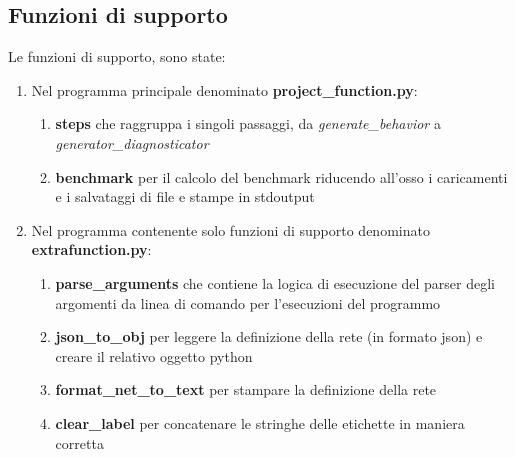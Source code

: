 \subsection{Funzioni di supporto}
Le funzioni di supporto, sono state:
\begin{enumerate}
    \item Nel programma principale denominato \textbf{project\_function.py}:
    \begin{enumerate}
        \item \textbf{steps} che raggruppa i singoli passaggi, da \textit{generate\_behavior }a \textit{generator\_diagnosticator}
        \item \textbf{benchmark} per il calcolo del benchmark riducendo all'osso i caricamenti e i salvataggi di file e stampe in stdoutput
    \end{enumerate}
    \item Nel programma contenente solo funzioni di supporto denominato \textbf{extrafunction.py}:
    \begin{enumerate}
        \item \textbf{parse\_arguments} che contiene la logica di esecuzione del parser degli argomenti da linea di comando per l'esecuzioni del programmo
        \item \textbf{json\_to\_obj} per leggere la definizione della rete (in formato json) e creare il relativo oggetto python
        \item \textbf{format\_net\_to\_text} per stampare la definizione della rete
        \item \textbf{clear\_label} per concatenare le stringhe delle etichette in maniera corretta
    \end{enumerate}
    
\end{enumerate}